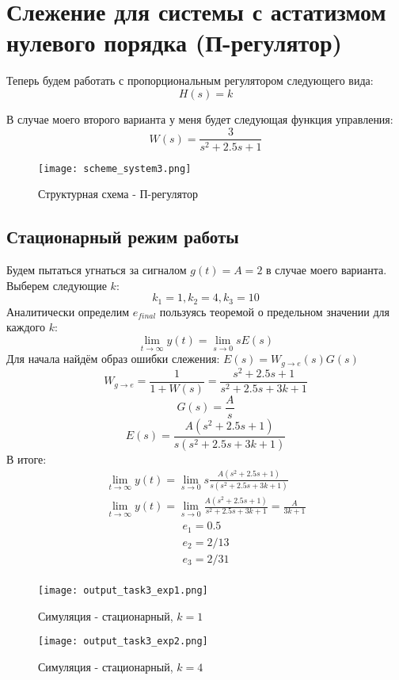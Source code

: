 \chapter{Слежение для системы с астатизмом нулевого порядка (П-регулятор)}
\label{ch:chap3}

Теперь будем работать с пропорциональным регулятором следующего вида:
$$
H(s) = k
$$

В случае моего второго варианта у меня будет следующая функция управления:
$$
  W(s) = \frac{3}{s^2+2.5s+1}
$$
\begin{figure}[ht]
  \centering
  \texttt{[image: scheme\_system3.png]}
\caption{Структурная схема - П-регулятор}
\end{figure}

\section{Стационарный режим работы}
Будем пытаться угнаться за сигналом $g(t) = A = 2$ в случае моего варианта.
Выберем следующие $k$:
$$
k_1 = 1, k_2 = 4,  k_3 = 10
$$
Аналитически определим $e_{final}$ пользуясь теоремой о предельном значении для каждого $k$:
$$
\lim_{t\to\infty} y(t) = \lim_{s\to 0}sE(s)
$$
Для начала найдём образ ошибки слежения: $E(s) = W_{g\to e}(s)G(s)$
$$
W_{g\to e} = \frac{1}{1+W(s)} = \frac{s^2 +2.5s + 1}{s^2 + 2.5s + 3k + 1}
$$
$$
G(s) = \frac{A}{s}
$$
$$
E(s) = \frac{A(s^2 +2.5s + 1)}{s(s^2 + 2.5s + 3k + 1)}
$$
В итоге:
$$
\begin{aligned}
  \lim_{t\to\infty} y(t) = \lim_{s\to 0}s\frac{A(s^2 +2.5s + 1)}{s(s^2 + 2.5s + 3k + 1)} \\
  \lim_{t\to\infty} y(t) = \lim_{s\to 0}\frac{A(s^2 +2.5s + 1)}{s^2 + 2.5s + 3k + 1} = \frac{A}{3k + 1}
\end{aligned}
$$
$$
\begin{aligned}
  e_{1} = 0.5 \\
  e_{2} = 2/13 \\
  e_{3} = 2/31 \\
\end{aligned}
$$

\begin{figure}[ht]
  \centering
  \texttt{[image: output\_task3\_exp1.png]}
\caption{Симуляция - стационарный, $k=1$}
\end{figure}

\newpage
\begin{figure}[ht]
  \centering
  \texttt{[image: output\_task3\_exp2.png]}
\caption{Симуляция - стационарный, $k=4$}
\end{figure}

